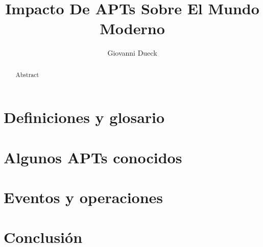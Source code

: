 \documentclass{article}
\title{Impacto De APTs Sobre El Mundo Moderno}
\author{Giovanni Dueck}
\begin{document}
\maketitle

\begin{abstract}
    Abstract
\end{abstract}


\section{Definiciones y glosario}

\section{Algunos APTs conocidos}

\section{Eventos y operaciones}

\section{Conclusión}
\end{document}
